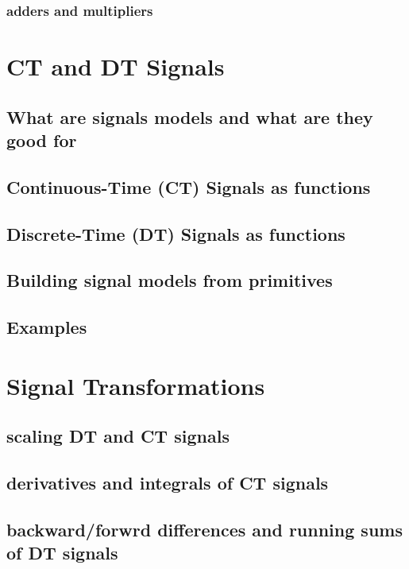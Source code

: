 \documentclass{article}
\begin{document}
\subsubsection{adders and multipliers}

\newpage
\section{CT and DT Signals}
\label{sec:org3203c88}
\subsection{What are signals models and what are they good for}
\label{sec:orga6591cb}
\subsection{Continuous-Time (CT) Signals as functions}
\label{sec:org6225bd5}
\subsection{Discrete-Time (DT) Signals as functions}
\label{sec:orga54c05e}
\subsection{Building signal models from primitives}
\label{sec:org08f49f3}
\subsection{Examples}
\label{sec:orgf29c95e}

\newpage
\section{Signal Transformations}
\label{sec:org6555689}
\subsection{scaling DT and CT signals}
\label{sec:org0fa5a47}
\subsection{derivatives and integrals of CT signals}
\label{sec:orgb56c3af}
\subsection{backward/forwrd differences and running sums of DT signals}
\label{sec:orgcb4a125}
\end{document}

